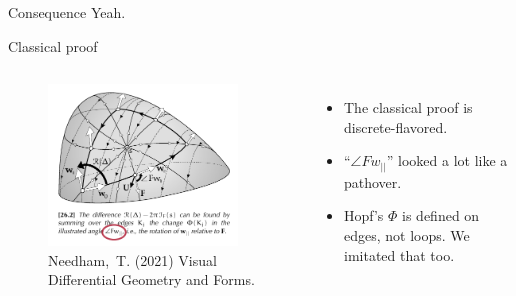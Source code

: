\begin{frame}{Consequence}
Yeah.
\end{frame}

\begin{frame}{Classical proof}
\begin{columns}
\vspace{12pt}
\begin{figure}
\includegraphics[width=0.9\textwidth]{figs/needham_triangle_circ.pdf}
\caption{{Needham,~T. (2021) Visual Differential Geometry and Forms.}}
\end{figure}
\vspace{-12pt}
\begin{itemize}
\item The classical proof is discrete-flavored.
\item ``\( \angle Fw_{||} \)'' looked a lot like a pathover.
\item Hopf's \( \Phi \) is defined on edges, not loops. We imitated that too.
\end{itemize}
\end{columns}
\end{frame}
